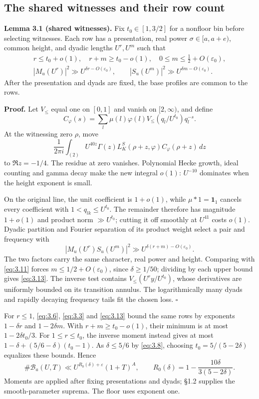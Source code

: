 \documentclass[11pt,a4paper]{article}
\begin{document}
\subsection{The shared witnesses and their row count}\label{sec:3.3}

\textbf{Lemma 3.1 (shared witnesses).} Fix \(t_0\in[1,3/2]\) for a nonfloor bin before selecting witnesses. Each row has a presentation, real power \(\sigma\in[a,a+e)\), common height, and dyadic lengths \(U^r,U^m\) such that \[
\begin{gathered}
 r\le t_0+o(1),\quad r+m\ge t_0-o(1),\quad 0\le m\le\tfrac12+O(\varepsilon_0),\\
 |M_u(U^r)|^2\gg U^{\delta r-O(\varepsilon_0)},\qquad
 |S_u(U^m)|^2\gg U^{\delta m-O(\varepsilon_0)}.
\end{gathered}
\tag{3.13}\label{eq:3.13}
\] After the presentation and dyads are fixed, the base profiles are common to the rows.

\textbf{Proof.} Let \(V_\le\) equal one on \([0,1]\) and vanish on \([2,\infty)\), and define \[
 C_\varphi(s)=\sum_l\mu(l)\varphi(l)V_\le(q_l/U^{t_0})q_l^{-s}.
\] At the witnessing zero \(\rho\), move \[
 \frac1{2\pi i}\int_{(2)}U^{40z}\Gamma(z)
 L_K^S(\rho+z,\varphi)C_\varphi(\rho+z)\,dz
\tag{3.14}\label{eq:3.14}
\] to \(\Re z=-1/4\). The residue at zero vanishes. Polynomial Hecke growth, ideal counting and gamma decay make the new integral \(o(1)\): \(U^{-10}\) dominates when the height exponent is small.

On the original line, the unit coefficient is \(1+o(1)\), while \(\mu*1=\mathbf1_1\) cancels every coefficient with \(1<q_{lk}\le U^{t_0}\). The remainder therefore has magnitude \(1+o(1)\) and product norm \(\gg U^{t_0}\); cutting it off smoothly at \(U^{41}\) costs \(o(1)\). Dyadic partition and Fourier separation of its product weight select a pair and frequency with \[
 |M_u(U^r)S_u(U^m)|^2\gg U^{\delta(r+m)-O(\varepsilon_0)}.
\] The two factors carry the same character, real power and height. Comparing with \eqref{eq:3.11} forces \(m\le1/2+O(\varepsilon_0)\), since \(\delta\ge1/50\); dividing by each upper bound gives \eqref{eq:3.13}. The inverse test contains \(V_\le(U^r y/U^{t_0})\), whose derivatives are uniformly bounded on its transition annulus. The logarithmically many dyads and rapidly decaying frequency tails fit the chosen loss. \hfill\(\square\)

For \(r\le1\), \eqref{eq:3.6}, \eqref{eq:3.3} and \eqref{eq:3.13} bound the same rows by exponents \(1-\delta r\) and \(1-2\delta m\). With \(r+m\ge t_0-o(1)\), their minimum is at most \(1-2\delta t_0/3\). For \(1\le r\le t_0\), the inverse moment instead gives at most \(1-\delta+(5/6-\delta)(t_0-1)\). As \(\delta\le5/6\) by \eqref{eq:3.8}, choosing \(t_0=5/(5-2\delta)\) equalizes these bounds. Hence \[
 \#\mathcal B_a(U,T)\ll U^{R_0(\delta)+\varepsilon}(1+T)^A,\qquad
 R_0(\delta)=1-\frac{10\delta}{3(5-2\delta)}.
\tag{3.15}\label{eq:3.15}
\] Moments are applied after fixing presentations and dyads; §1.2 supplies the smooth-parameter suprema. The floor uses exponent one.
\end{document}
